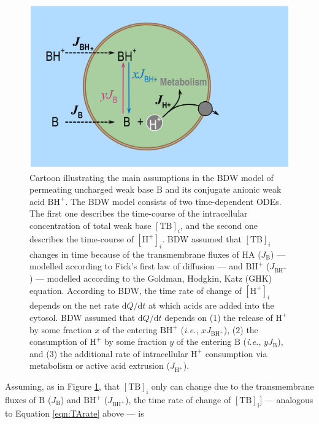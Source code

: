 \documentclass[fleqn,10pt]{physiome}
\begin{document}
\begin{figure}
\centering
\includegraphics[scale=0.2]{Figure 5.png}
\caption{\label{fig:5} Cartoon illustrating the main assumptions in the BDW model of permeating uncharged weak base $\mathrm{B}$ and its conjugate anionic weak acid $\mathrm{BH^+}$. The BDW model consists of two time-dependent ODEs. The first one describes the time-course of the intracellular concentration of total weak base $\mathrm{[TB]}_i$, and the second one describes the time-course of $\mathrm{[H^+]}_i$. BDW assumed that $\mathrm{[TB]}_i$ changes in time because of the transmembrane fluxes of $\mathrm{HA}$ ($J_\mathrm{B}$) --- modelled according to Fick's first law of diffusion --- and $\mathrm{BH^+}$ ($J_\mathrm{BH^+}$) --- modelled according to the Goldman, Hodgkin, Katz (GHK) equation. According to BDW, the time rate of change of $\mathrm{[H^+]}_i$ depends on the net rate $\mathrm{d}Q/\mathrm{d}t$ at which acids are added into the cytosol. BDW assumed that $\mathrm{d}Q/\mathrm{d}t$ depends on ($1$) the release of $\mathrm{H^+}$ by some fraction $x$ of the entering $\mathrm{BH^+}$ (\emph{i.e.}, $xJ_\mathrm{BH^+}$), ($2$) the consumption of $\mathrm{H^+}$ by some fraction $y$ of the entering $\mathrm{B}$ (\emph{i.e.}, $yJ_\mathrm{B}$), and ($3$) the additional rate of intracellular $\mathrm{H^+}$ consumption via metabolism or active acid extrusion ($J_\mathrm{H^+}$).}
\end{figure}


Assuming, as in Figure \ref{fig:5}, that $\mathrm{[TB]_i}$ only can change due to the transmembrane fluxes of $\mathrm{B}$ ($J_\mathrm{B}$) and $\mathrm{BH^+}$ ($J_{\mathrm{BH^+}}$), the time rate of change of $\mathrm{[TB]_i]}$ --- analogous to Equation \ref{eqn:TArate} above --- is
\end{document}
